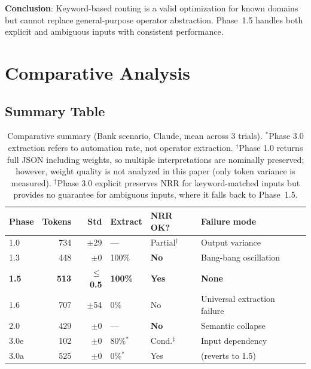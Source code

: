 \documentclass[11pt,a4paper]{article}
\begin{document}
\textbf{Conclusion}: Keyword-based routing is a valid optimization for known
domains but cannot replace general-purpose operator abstraction. Phase~1.5
handles both explicit and ambiguous inputs with consistent performance.

\section{Comparative Analysis}
\label{sec:comparative}

\subsection{Summary Table}

\begin{table}[ht]
\centering
\small
\begin{tabular}{lrrllll}
\toprule
\textbf{Phase} & \textbf{Tokens} & \textbf{Std} & \textbf{Extract} & \textbf{NRR OK?} & \textbf{Failure mode} \\
\midrule
1.0 & 734 & $\pm$29 & --- & Partial$^\dagger$ & Output variance \\
1.3 & 448 & $\pm$0 & 100\% & \textbf{No} & Bang-bang oscillation \\
\textbf{1.5} & \textbf{513} & $\leq$\textbf{0.5} & \textbf{100\%} & \textbf{Yes} & \textbf{None} \\
1.6 & 707 & $\pm$54 & 0\% & No & Universal extraction failure \\
2.0 & 429 & $\pm$0 & --- & \textbf{No} & Semantic collapse \\
3.0e & 102 & $\pm$0 & 80\%$^*$ & Cond.$^\ddagger$ & Input dependency \\
3.0a & 525 & $\pm$0 & 0\%$^*$ & Yes & (reverts to 1.5) \\
\bottomrule
\end{tabular}
\caption{Comparative summary (Bank scenario, Claude, mean across 3 trials).
$^*$Phase 3.0 extraction refers to automation rate, not operator extraction.
$^\dagger$Phase 1.0 returns full JSON including weights, so multiple
interpretations are nominally preserved; however, weight quality is not analyzed
in this paper (only token variance is measured).
$^\ddagger$Phase 3.0 explicit preserves NRR for keyword-matched inputs but
provides no guarantee for ambiguous inputs, where it falls back to Phase~1.5.}
\label{tab:comparative}
\end{table}
\end{document}
